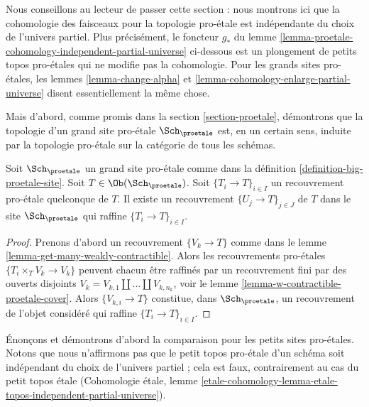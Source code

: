 \noindent
Nous conseillons au lecteur de passer cette section : nous montrons ici que la cohomologie
des faisceaux pour la topologie pro-\'etale est indépendante du
choix de l'univers partiel. Plus précisément, le foncteur $g_*$ du
lemme \ref{lemma-proetale-cohomology-independent-partial-universe} ci-dessous
est un plongement de petits topos pro-\'etales qui ne modifie pas la cohomologie.
Pour les grands sites pro-\'etales, les lemmes \ref{lemma-change-alpha} et
\ref{lemma-cohomology-enlarge-partial-universe} disent essentiellement la
même chose.

\medskip\noindent
Mais d'abord, 
comme promis dans la section \ref{section-proetale}, démontrons que la topologie d'un
grand site pro-\'etale $\Sch_\proetale$ est, en un certain sens, induite par
la topologie pro-\'etale sur la catégorie de tous les schémas.

\begin{lemma}
\label{lemma-proetale-induced}
Soit $\Sch_\proetale$ un grand site pro-\'etale comme dans la
définition \ref{definition-big-proetale-site}.
Soit $T \in \Ob(\Sch_\proetale)$.
Soit $\{T_i \to T\}_{i \in I}$ un recouvrement pro-\'etale quelconque de $T$.
Il existe un recouvrement $\{U_j \to T\}_{j \in J}$ de $T$ dans le site
$\Sch_\proetale$ qui raffine $\{T_i \to T\}_{i \in I}$.
\end{lemma}

\begin{proof}
Prenons d'abord un recouvrement $\{V_k \to T\}$ comme dans le
lemme \ref{lemma-get-many-weakly-contractible}.
Alors les recouvrements pro-\'etales $\{T_i \times_T V_k \to V_k\}$
peuvent chacun être raffinés par un recouvrement fini par des ouverts disjoints
$V_k = V_{k, 1} \amalg \ldots \amalg V_{k, n_k}$, voir le
lemme \ref{lemma-w-contractible-proetale-cover}.
Alors $\{V_{k, i} \to T\}$ constitue, dans $\Sch_\proetale$, un recouvrement de l'objet considéré
qui raffine $\{T_i \to T\}_{i \in I}$.
\end{proof}

\noindent
Énonçons et démontrons d'abord la comparaison pour les petits sites
pro-\'etales. Notons que nous n'affirmons pas que le petit topos pro-\'etale
d'un schéma soit indépendant du choix de l'univers partiel ; cela est faux,
contrairement au cas du petit topos \'etale
(Cohomologie étale, lemme
\ref{etale-cohomology-lemma-etale-topos-independent-partial-universe}).

